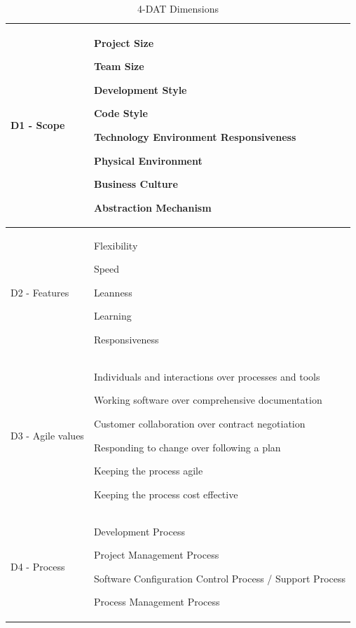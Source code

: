 \begin{table} [H]
\caption{4-DAT Dimensions}
\begin{tabular}{ | p{3cm} | p{11cm} |} \hline
	D1 - Scope & \begin{inparaenum} [a\upshape)]
		\item Project Size
		\item Team Size
		\item Development Style
		\item Code Style
		\item Technology Environment Responsiveness
		\item Physical Environment
		\item Business Culture
		\item Abstraction Mechanism
	\end{inparaenum} \\ \hline
	D2 - Features & \begin{inparaenum} [a\upshape)]
		\item Flexibility
		\item Speed
		\item Leanness
		\item Learning
		\item Responsiveness
	\end{inparaenum} \\ \hline
	D3 - Agile values & \begin{inparaenum} [a\upshape)]
		\item Individuals and interactions over processes and tools
		\item Working software over comprehensive documentation
		\item Customer collaboration over contract negotiation
		\item Responding to change over following a plan
		\item Keeping the process agile
		\item Keeping the process cost effective
	\end{inparaenum} \\ \hline
	D4 - Process & \begin{inparaenum} [a\upshape)]
		\item Development Process
		\item Project Management Process
		\item Software Configuration Control Process / Support Process
		\item Process Management Process
	\end{inparaenum}\\ 
	\hline
\end{tabular}
\end{table}

